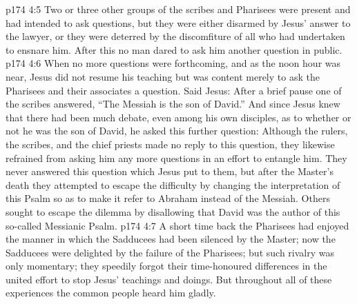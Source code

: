 \vs p174 4:5 \pc Two or three other groups of the scribes and Pharisees were present and had intended to ask questions, but they were either disarmed by Jesus’ answer to the lawyer, or they were deterred by the discomfiture of all who had undertaken to ensnare him. After this no man dared to ask him another question in public.
\vs p174 4:6 When no more questions were forthcoming, and as the noon hour was near, Jesus did not resume his teaching but was content merely to ask the Pharisees and their associates a question. Said Jesus:  After a brief pause one of the scribes answered, “The Messiah is the son of David.” And since Jesus knew that there had been much debate, even among his own disciples, as to whether or not he was the son of David, he asked this further question:  Although the rulers, the scribes, and the chief priests made no reply to this question, they likewise refrained from asking him any more questions in an effort to entangle him. They never answered this question which Jesus put to them, but after the Master’s death they attempted to escape the difficulty by changing the interpretation of this Psalm so as to make it refer to Abraham instead of the Messiah. Others sought to escape the dilemma by disallowing that David was the author of this so\hyp{}called Messianic Psalm.
\vs p174 4:7 A short time back the Pharisees had enjoyed the manner in which the Sadducees had been silenced by the Master; now the Sadducees were delighted by the failure of the Pharisees; but such rivalry was only momentary; they speedily forgot their time\hyp{}honoured differences in the united effort to stop Jesus’ teachings and doings. But throughout all of these experiences the common people heard him gladly.

